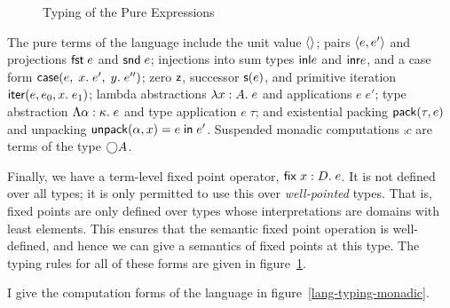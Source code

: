 \begin{figure}
\caption{Typing of the Pure Expressions}
\label{lang-typing-pure}
\end{figure}

The pure terms of the language include the unit value $\left<\right>$; pairs
$\left<{e},{e'}\right>$ and projections $\mathsf{fst}\; e$ and $\mathsf{snd}\; e$; injections
into sum types $\mathsf{inl }e$ and $\mathsf{inr }e$, and a case form
$\mathsf{case}(e,\; {x}.\; e',\; {y}.\; e'')$; zero $\mathsf{z}$, successor $\mathsf{s}(e)$, and primitive
iteration $\mathsf{iter}(e, {e_0}, {x}.\; {e_1})$; lambda abstractions $\lambda x:A.\;e$
and applications $e\;e'$; type abstraction $\Lambda \alpha:\kappa.\;e$
and type application $e\;\tau$; and existential packing
$\mathsf{pack}({\tau}, {e})$ and unpacking $\mathsf{unpack}({\alpha}, {x}) = {e} \;\mathsf{in}\;{e'}$. Suspended
monadic computations $\comp{c}$ are terms of the type $\bigcirc{A}$.

Finally, we have a term-level fixed point operator, $\mathsf{fix}\;{x:D}.\;{e}$. It
is not defined over all types; it is only permitted to use this over
\emph{well-pointed} types. That is, fixed points are only defined over
types whose interpretations are domains with least elements. This
ensures that the semantic fixed point operation is well-defined, and
hence we can give a semantics of fixed points at this type. The typing
rules for all of these forms are given in figure~\ref{lang-typing-pure}. 

I give the computation forms of the language in
figure~\ref{lang-typing-monadic}. 


